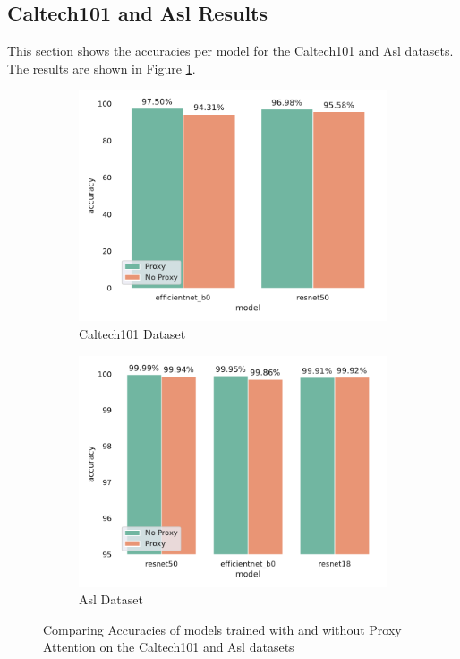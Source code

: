 \subsection{Caltech101 and Asl Results}
This section shows the accuracies per model for the Caltech101 and Asl datasets. The results are shown in Figure \ref{fig:caltech101_asl_results}.
\begin{figure}[H]
    \begin{subfigure}[h]{.5\textwidth}
        \includegraphics[width=\linewidth, right]{results/caltech101_results.pdf}
        \caption{Caltech101 Dataset}
    \end{subfigure}
    \begin{subfigure}[h]{.5\textwidth}
        \includegraphics[width=\linewidth, left]{results/asl_results.pdf}
        \caption{Asl Dataset}
    \end{subfigure}
    \caption{Comparing Accuracies of models trained with and without Proxy Attention on the Caltech101 and Asl datasets}
    \label{fig:caltech101_asl_results}
\end{figure}

